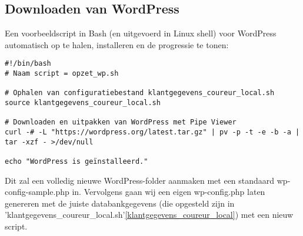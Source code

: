 \subsection{Downloaden van WordPress}
Een voorbeeldscript in Bash (en uitgevoerd in Linux shell) voor WordPress automatisch op te halen, installeren en de progressie te tonen:
\label{opzet_wp_script}\begin{verbatim}
#!/bin/bash
# Naam script = opzet_wp.sh

# Ophalen van configuratiebestand klantgegevens_coureur_local.sh
source klantgegevens_coureur_local.sh

# Downloaden en uitpakken van WordPress met Pipe Viewer
curl -# -L "https://wordpress.org/latest.tar.gz" | pv -p -t -e -b -a | tar -xzf - >/dev/null

echo "WordPress is geïnstalleerd."
\end{verbatim}
Dit zal een volledig nieuwe WordPress-folder aanmaken met een standaard wp-config-sample.php in. Vervolgens gaan wij een eigen wp-config.php laten genereren met de juiste databankgegevens (die opgesteld zijn in 'klantgegevens\_coureur\_local.sh'\ref{klantgegevens_coureur_local}) met een nieuw script.

